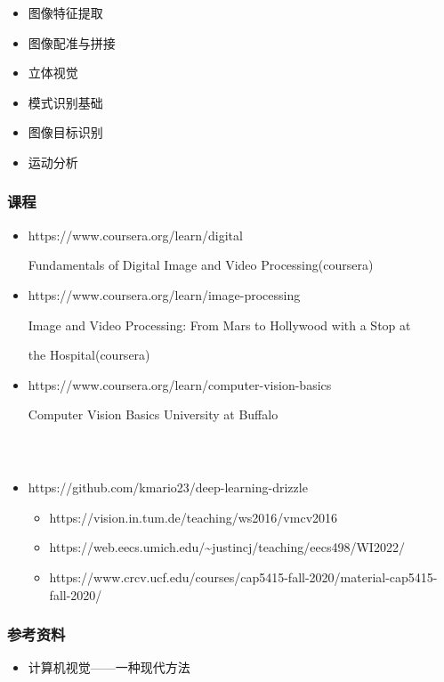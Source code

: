 \documentclass{beamer}
\newenvironment{itemizearrow}{\begin{itemize} \renewcommand{\labelitemi}{$\rightarrow$}\renewcommand{\labelitemii}{$\rightarrow$}\renewcommand{\labelitemiii}{$\rightarrow$}\renewcommand{\labelitemiv}{$\rightarrow$}}{\end{itemize}}
\newenvironment{itemizedot}{\begin{itemize} \renewcommand{\labelitemi}{$\bullet$}\renewcommand{\labelitemii}{$\bullet$}\renewcommand{\labelitemiii}{$\bullet$}\renewcommand{\labelitemiv}{$\bullet$}}{\end{itemize}}
\begin{document}
{{\begin{frame}
\begin{itemizedot}
    \item 图像特征提取
    
    \item 图像配准与拼接
    
    \item 立体视觉
    
    \item 模式识别基础
    
    \item 图像目标识别
    
    \item 运动分析
  \end{itemizedot}
\end{frame}}{\begin{frame}
  \frametitle{课程}
  \begin{itemizedot}
    \item https://www.coursera.org/learn/digital
    
    Fundamentals of Digital Image and Video Processing(coursera)
    
    \item https://www.coursera.org/learn/image-processing
    
    Image and Video Processing: From Mars to Hollywood with a Stop at
    
    the Hospital(coursera)
    
    \item https://www.coursera.org/learn/computer-vision-basics
    
    Computer Vision Basics University at Buffalo
  \end{itemizedot}
\end{frame}}{\begin{frame}
  \frametitle{\ }
  \begin{itemizedot}
    \item https://github.com/kmario23/deep-learning-drizzle
    \begin{itemizearrow}
      \item https://vision.in.tum.de/teaching/ws2016/vmcv2016
      
      \item https://web.eecs.umich.edu/\~{}justincj/teaching/eecs498/WI2022/
      
      \item
      https://www.crcv.ucf.edu/courses/cap5415-fall-2020/material-cap5415-fall-2020/
    \end{itemizearrow}
  \end{itemizedot}
\end{frame}}{\begin{frame}
  \frametitle{参考资料}
  \begin{itemizedot}
    \item 计算机视觉------一种现代方法
    

\end{itemizedot}
\end{frame}}}
\end{document}
